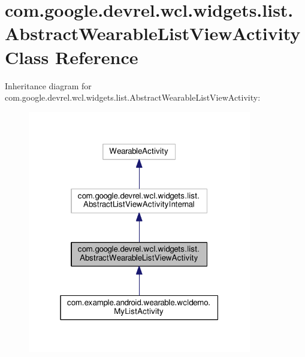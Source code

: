 \hypertarget{classcom_1_1google_1_1devrel_1_1wcl_1_1widgets_1_1list_1_1AbstractWearableListViewActivity}{}\section{com.\+google.\+devrel.\+wcl.\+widgets.\+list.\+Abstract\+Wearable\+List\+View\+Activity Class Reference}
\label{classcom_1_1google_1_1devrel_1_1wcl_1_1widgets_1_1list_1_1AbstractWearableListViewActivity}


Inheritance diagram for com.\+google.\+devrel.\+wcl.\+widgets.\+list.\+Abstract\+Wearable\+List\+View\+Activity\+:\nopagebreak
\begin{figure}[H]
\begin{center}
\leavevmode
\includegraphics[width=277pt]{dd/d7c/classcom_1_1google_1_1devrel_1_1wcl_1_1widgets_1_1list_1_1AbstractWearableListViewActivity__inherit__graph}
\end{center}
\end{figure}


